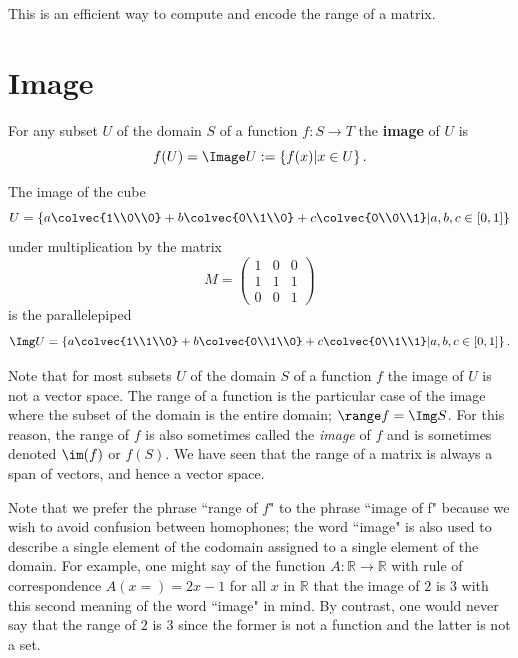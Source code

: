 \noindent
This is an efficient way to compute and encode the range of a matrix.

\section{Image} 

\begin{definition}
For any subset $U$ of the domain $S$ of a function $f:S\to T$  the {\bfseries image} of $U$ is 
\[f(U)=\Image U:= \left\{  f(x) | x\in U \right\} .\]
\end{definition}

\begin{example} 
The image of the  cube
\[U= \left\{  a \colvec{1\\0\\0} +b \colvec{0\\1\\0}+c\colvec{0\\0\\1} \middle| a,b,c \in [0,1] \right\} \] 
under multiplication by the matrix 
\[ M=
\begin{pmatrix}
1&0&0\\
1&1&1\\
0&0&1
\end{pmatrix}
\]
is the parallelepiped 
\[
\Img U= 
 \left\{  a \colvec{1\\1\\0} +b \colvec{0\\1\\0}+c\colvec{0\\1\\1} \middle| a,b,c \in [0,1] \right\} .
\]
\end{example}

Note that for most subsets $U$ of the domain $S$  of a function  $f$ the image of $U$ is not a vector space. 
The range of a function is the particular case of the image where the subset of the domain is the entire domain; $\range  f = \Img S$. 
For this reason, the range of $f$ is also sometimes called the \emph{image} of $f$ and is sometimes denoted $\im(f)$ or  $f(S).$  We have seen that the range of a matrix is always a span of vectors, and hence a vector space. 

Note that we prefer the phrase ``range of $f$" to the phrase ``image of f"  
because we wish to avoid confusion between homophones;
 the word 
``image" is also used to describe a single element of the codomain assigned to a single element of the domain. 
For example, 
one might say of 
the function $A:\mathbb{R}\to\mathbb{R}$ with rule of correspondence $A(x=)=2x-1$ for all $x$ in $\mathbb{R}$ that the image of $2$ is $3$ with this second meaning of the word ``image" in mind. 
By contrast, one would never say that the range of $2$ is $3$ since the former is not a function and the latter is not a set.


